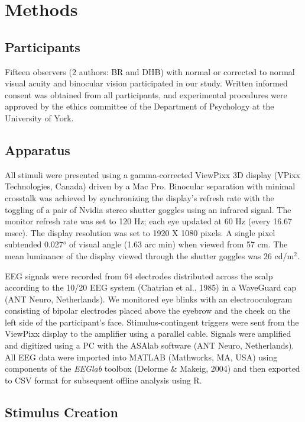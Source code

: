 \documentclass[
  12pt,
]{article}
\begin{document}
\section{Methods}\label{methods}

\subsection{Participants}\label{participants}

Fifteen observers (2 authors: BR and DHB) with normal or corrected to
normal visual acuity and binocular vision participated in our study.
Written informed consent was obtained from all participants, and
experimental procedures were approved by the ethics committee of the
Department of Psychology at the University of York.

\subsection{Apparatus}\label{apparatus}

All stimuli were presented using a gamma-corrected ViewPixx 3D display
(VPixx Technologies, Canada) driven by a Mac Pro. Binocular separation
with minimal crosstalk was achieved by synchronizing the display's
refresh rate with the toggling of a pair of Nvidia stereo shutter
goggles using an infrared signal. The monitor refresh rate was set to
120 Hz; each eye updated at 60 Hz (every 16.67 msec). The display
resolution was set to 1920 X 1080 pixels. A single pixel subtended
0.027\(^o\) of visual angle (1.63 arc min) when viewed from 57 cm. The
mean luminance of the display viewed through the shutter goggles was 26
cd/m\(^2\).

EEG signals were recorded from 64 electrodes distributed across the
scalp according to the 10/20 EEG system (Chatrian et al., 1985) in a
WaveGuard cap (ANT Neuro, Netherlands). We monitored eye blinks with an
electrooculogram consisting of bipolar electrodes placed above the
eyebrow and the cheek on the left side of the participant's face.
Stimulus-contingent triggers were sent from the ViewPixx display to the
amplifier using a parallel cable. Signals were amplified and digitized
using a PC with the ASAlab software (ANT Neuro, Netherlands). All EEG
data were imported into MATLAB (Mathworks, MA, USA) using components of
the \textit{EEGlab} toolbox (Delorme \& Makeig, 2004) and then exported
to CSV format for subsequent offline analysis using R.

\subsection{Stimulus Creation}\label{stimulus-creation}
\end{document}
